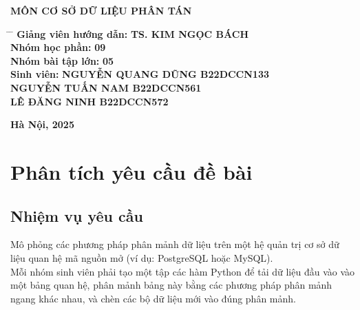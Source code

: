 \documentclass[a4paper]{article}
\begin{document}
\begin{titlepage}
\begin{center}
			\vspace{7pt}
			\textbf{MÔN CƠ SỞ DỮ LIỆU PHÂN TÁN}
		\end{center}
		

		
		\vspace{6pt}

		\begin{adjustwidth}{1.5cm}{0cm}
    \begin{tabbing}
        \fontsize{16pt}{20pt}\selectfont
        \hspace{6cm} \= \hspace{5cm} \= \kill
        \textbf{Giảng viên hướng dẫn:} \> \textbf{TS. KIM NGỌC BÁCH} \>\\ [6pt]
        \textbf{Nhóm học phần:} \> \textbf{09} \>\\ [6pt]
        \textbf{Nhóm bài tập lớn:} \> \textbf{05} \>\\ [6pt]
        \textbf{Sinh viên:} \> \textbf{NGUYỄN QUANG DŨNG B22DCCN133} \>\\ [6pt]
                            \> \textbf{NGUYỄN TUẤN NAM B22DCCN561} \>\\ [6pt]
                            \> \textbf{LÊ ĐĂNG NINH B22DCCN572} \>\\ [6pt]
    \end{tabbing}
\end{adjustwidth}

		
		
		\vspace{14pt}
		\begin{center}
			\textbf{Hà Nội, 2025}
		\end{center}
	\end{titlepage}
	

\clearpage
\tableofcontents

\clearpage


\renewcommand{\listfigurename}{Danh mục hình ảnh}
\listoffigures
{}



\renewcommand{\listtablename}{Danh mục bảng biểu}
\listoftables
{}
\newpage

\section{Phân tích yêu cầu đề bài}
\subsection{Nhiệm vụ yêu cầu}
Mô phỏng các phương pháp phân mảnh dữ liệu trên một hệ quản trị cơ sở dữ liệu quan hệ mã nguồn mở (ví dụ: PostgreSQL hoặc MySQL).\\
Mỗi nhóm sinh viên phải tạo một tập các hàm Python để tải dữ liệu đầu vào vào một bảng quan hệ, phân mảnh bảng này bằng các phương pháp phân mảnh ngang khác nhau, và chèn các bộ dữ liệu mới vào đúng phân mảnh.
\end{document}
